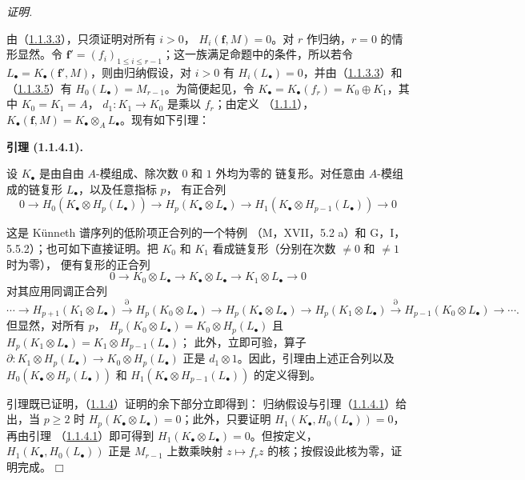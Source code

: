\documentclass[UTF8,fontset=none,11pt,oneside,openany]{ctexbook}
\providecommand{\square}{\mdlgwhtsquare}
\newenvironment{lemma}[1][]{%
  \par\medskip\noindent\textbf{引理 (#1).}\ %
}{\par}
\newenvironment{proof}{%
  \par\smallskip\noindent\textit{证明.}\ %
}{\hfill$\square$\par}
\newcommand{\oldpage}[2][]{%
  \hypertarget{ega-source-page-#1-#2}{}%
  \marginnote{\scriptsize\textbf{#1}~|~#2}\ignorespaces}
\let\EGAOriginalLabel\label
\renewcommand{\label}[1]{\phantomsection\EGAOriginalLabel{#1}}
\begin{document}
\begin{proof}
由（\hyperref[III.1.1.3.3-fr]{1.1.3.3}），只须证明对所有 $i>0$，
$H_i(\mathbf f,M)=0$。对 $r$ 作归纳，$r=0$ 的情形显然。令
$\mathbf f'=(f_i)_{1\leq i\leq r-1}$；这一族满足命题中的条件，所以若令
$L_\bullet=K_\bullet(\mathbf f',M)$，则由归纳假设，对 $i>0$ 有
$H_i(L_\bullet)=0$，并由（\hyperref[III.1.1.3.3-fr]{1.1.3.3}）和
（\hyperref[III.1.1.3.5-fr]{1.1.3.5}）有
$H_0(L_\bullet)=M_{r-1}$。为简便起见，令
$K_\bullet=K_\bullet(f_r)=K_0\oplus K_1$，其中 $K_0=K_1=A$，
$d_1:K_1\to K_0$ 是乘以 $f_r$；由定义
（\hyperref[III.1.1.1-fr]{1.1.1}），
$K_\bullet(\mathbf f,M)=K_\bullet\otimes_A L_\bullet$。现有如下引理：

\begin{lemma}[1.1.4.1]
\label{III.1.1.4.1-fr}
设 $K_\bullet$ 是由自由 $A$-模组成、除次数 $0$ 和 $1$ 外均为零的
链复形。对任意由 $A$-模组成的链复形 $L_\bullet$，以及任意指标 $p$，
有正合列
\[
0\longrightarrow H_0(K_\bullet\otimes H_p(L_\bullet))
\longrightarrow H_p(K_\bullet\otimes L_\bullet)
\longrightarrow H_1(K_\bullet\otimes H_{p-1}(L_\bullet))
\longrightarrow0
\]
\end{lemma}

\oldpage[III]{84}
这是 Künneth 谱序列的低阶项正合列的一个特例
（M，XVII，5.2 a）和 G，I，5.5.2）；也可如下直接证明。把 $K_0$
和 $K_1$ 看成链复形（分别在次数 $\neq0$ 和 $\neq1$ 时为零），
便有复形的正合列
\[
0\longrightarrow K_0\otimes L_\bullet
\longrightarrow K_\bullet\otimes L_\bullet
\longrightarrow K_1\otimes L_\bullet\longrightarrow0
\]
对其应用同调正合列
\[
\cdots\longrightarrow H_{p+1}(K_1\otimes L_\bullet)
\xrightarrow{\partial}H_p(K_0\otimes L_\bullet)
\longrightarrow H_p(K_\bullet\otimes L_\bullet)
\longrightarrow H_p(K_1\otimes L_\bullet)
\xrightarrow{\partial}H_{p-1}(K_0\otimes L_\bullet)
\longrightarrow\cdots.
\]
但显然，对所有 $p$，
$H_p(K_0\otimes L_\bullet)=K_0\otimes H_p(L_\bullet)$ 且
$H_p(K_1\otimes L_\bullet)=K_1\otimes H_{p-1}(L_\bullet)$；
此外，立即可验，算子
$\partial:K_1\otimes H_p(L_\bullet)\to K_0\otimes H_p(L_\bullet)$
正是 $d_1\otimes1$。因此，引理由上述正合列以及
$H_0(K_\bullet\otimes H_p(L_\bullet))$ 和
$H_1(K_\bullet\otimes H_{p-1}(L_\bullet))$ 的定义得到。

引理既已证明，（\hyperref[III.1.1.4-fr]{1.1.4}）证明的余下部分立即得到：
归纳假设与引理（\hyperref[III.1.1.4.1-fr]{1.1.4.1}）给出，当
$p\geq2$ 时 $H_p(K_\bullet\otimes L_\bullet)=0$；此外，只要证明
$H_1(K_\bullet,H_0(L_\bullet))=0$，再由引理
（\hyperref[III.1.1.4.1-fr]{1.1.4.1}）即可得到
$H_1(K_\bullet\otimes L_\bullet)=0$。但按定义，
$H_1(K_\bullet,H_0(L_\bullet))$ 正是 $M_{r-1}$ 上数乘映射
$z\mapsto f_rz$ 的核；按假设此核为零，证明完成。
\end{proof}
\end{document}
